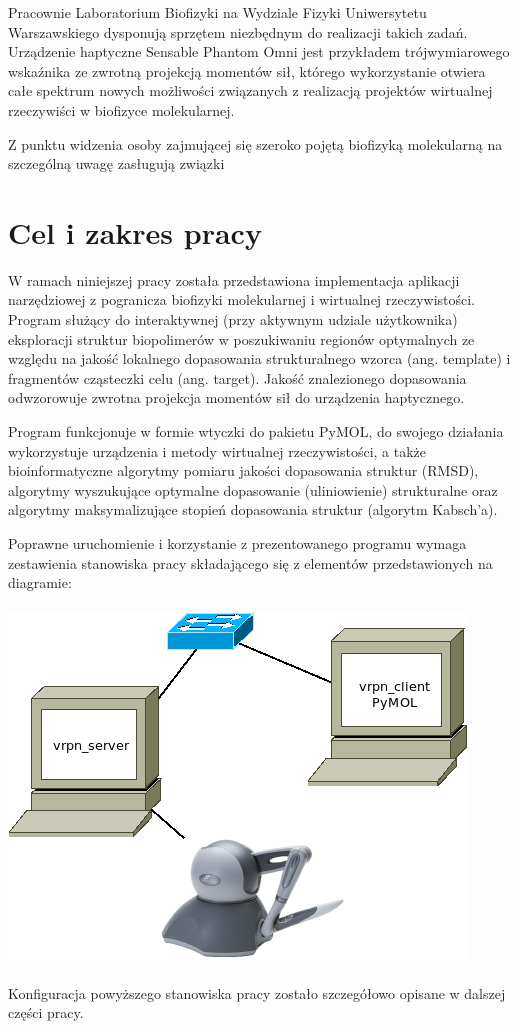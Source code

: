 \documentclass[licencjacka]{pracamgr}
\begin{document}
Pracownie Laboratorium Biofizyki na Wydziale Fizyki Uniwersytetu Warszawskiego dysponują sprzętem niezbędnym do realizacji takich zadań. Urządzenie haptyczne Sensable Phantom Omni jest przykładem trójwymiarowego wskaźnika ze zwrotną projekcją momentów sił, którego wykorzystanie otwiera całe spektrum nowych możliwości związanych z realizacją projektów wirtualnej rzeczywiści w biofizyce molekularnej. 
	
Z punktu widzenia osoby zajmującej się szeroko pojętą biofizyką molekularną na szczególną uwagę zasługują związki

\chapter*{Cel i zakres pracy}

W ramach niniejszej pracy została przedstawiona implementacja aplikacji narzędziowej z pogranicza biofizyki molekularnej i wirtualnej rzeczywistości. Program służący do interaktywnej (przy aktywnym udziale użytkownika) eksploracji struktur biopolimerów w poszukiwaniu regionów optymalnych ze względu na jakość lokalnego dopasowania strukturalnego wzorca (ang. template) i fragmentów cząsteczki celu (ang. target). Jakość znalezionego dopasowania odwzorowuje zwrotna projekcja momentów sił do urządzenia haptycznego. 
	
Program funkcjonuje w formie wtyczki do pakietu PyMOL, do swojego działania wykorzystuje urządzenia i metody wirtualnej rzeczywistości, a także bioinformatyczne algorytmy pomiaru jakości dopasowania struktur (RMSD), algorytmy wyszukujące optymalne dopasowanie (uliniowienie) strukturalne oraz algorytmy maksymalizujące stopień dopasowania struktur (algorytm Kabsch'a).

Poprawne uruchomienie i korzystanie z prezentowanego programu wymaga zestawienia stanowiska pracy składającego się z elementów przedstawionych na diagramie:
\\
\\
\includegraphics[scale=0.8,center]{stanowisko}
\\
\\
Konfiguracja powyższego stanowiska pracy zostało szczegółowo opisane w dalszej części pracy.
\end{document}
